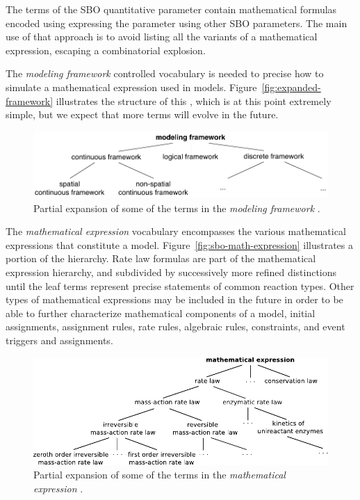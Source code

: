 The terms of the SBO quantitative parameter  contain
mathematical formulas encoded using \mathmltwo
expressing the parameter using other SBO parameters.  The
main use of that approach is to avoid listing all the variants of a
mathematical expression, escaping a combinatorial explosion.

The \emph{modeling framework} controlled vocabulary is needed to
precise how to simulate a mathematical expression used in models.  Figure~\vref{fig:expanded-framework}
illustrates the structure of this , which is at this point
extremely simple, but we expect that more terms will evolve in the
future.

\begin{figure}[tbh]
  \centering
  \vspace*{1ex}
  \includegraphics[scale = 0.8]{figs/sbo-framework}
  \caption{Partial expansion of some of the terms in the
    \emph{modeling framework} .}
  \label{fig:expanded-framework}
\end{figure}

The \emph{mathematical expression} vocabulary encompasses the
various mathematical expressions that constitute a model.
Figure~\vref{fig:sbo-math-expression} illustrates a portion of the
hierarchy.  Rate law  formulas are part of the mathematical
expression hierarchy, and subdivided by successively more refined
distinctions until the leaf terms represent precise statements of
common reaction  types.  Other types of mathematical expressions
may be included in the future in order to be
able to further characterize mathematical components of a model,  initial assignments, assignment rules, rate rules,
algebraic rules, constraints, and event triggers and assignments.

\begin{figure}[tbh]
  \centering
  \includegraphics[scale = 0.8]{figs/sbo-math-expression}
  \caption{Partial expansion of some of the terms in the \emph{mathematical
      expression} .}
  \label{fig:sbo-math-expression}
\end{figure}

